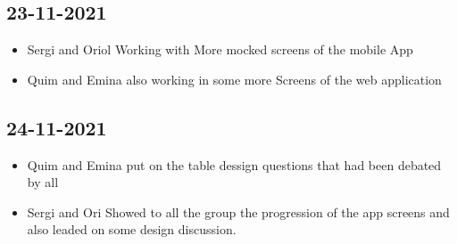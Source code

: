 \documentclass[./main.tex]{subfiles}
\begin{document}
\subsection{23-11-2021}
\begin{itemize}
\item Sergi and Oriol Working with More mocked screens of the mobile App
\item Quim and Emina also working in some more Screens of the web application
\end{itemize}

\subsection{24-11-2021}
\begin{itemize}
  \item Quim and Emina put on the table dessign questions that had been debated by all
  \item Sergi and Ori Showed to all the group the progression of the app screens and also leaded on some design discussion.
\end{itemize}
\end{document}

